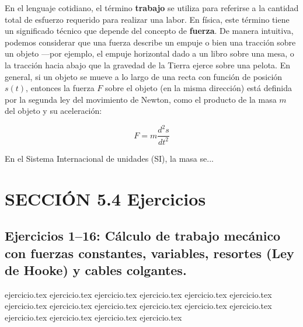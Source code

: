 
En el lenguaje cotidiano, el término \textbf{trabajo} se utiliza para referirse a la cantidad total de esfuerzo requerido para realizar una labor. En física, este término tiene un significado técnico que depende del concepto de \textbf{fuerza}. De manera intuitiva, podemos considerar que una fuerza describe un empuje o bien una tracción sobre un objeto —por ejemplo, el empuje horizontal dado a un libro sobre una mesa, o la tracción hacia abajo que la gravedad de la Tierra ejerce sobre una pelota. En general, si un objeto se mueve a lo largo de una recta con función de posición $s(t)$, entonces la fuerza $F$ sobre el objeto (en la misma dirección) está definida por la segunda ley del movimiento de Newton, como el producto de la masa $m$ del objeto y su aceleración:

\begin{equation}
F = m \frac{d^2s}{dt^2} \tag{5.12}
\end{equation}

\noindent En el Sistema Internacional de unidades (SI), la masa se...

\section*{SECCIÓN 5.4 \quad Ejercicios}

\subsection*{Ejercicios 1--16: Cálculo de trabajo mecánico con fuerzas constantes, variables, resortes (Ley de Hooke) y cables colgantes.}

\begin{enumerate}
    {ejercicio.tex}
    {ejercicio.tex}
    {ejercicio.tex}
    {ejercicio.tex}
    {ejercicio.tex}
    {ejercicio.tex}
    {ejercicio.tex}
    {ejercicio.tex}
    {ejercicio.tex}
    {ejercicio.tex}
    {ejercicio.tex}
    {ejercicio.tex}
    {ejercicio.tex}
    {ejercicio.tex}
    {ejercicio.tex}
    {ejercicio.tex}
\end{enumerate}

